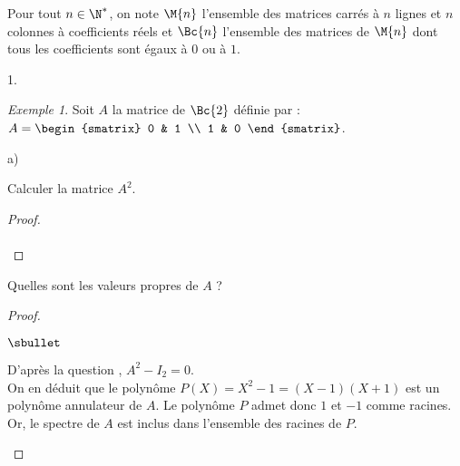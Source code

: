 \noindent
Pour tout $n\in\N^*$, on note $\M{n}$ l'ensemble des matrices carrés à
$n$ lignes et $n$ colonnes à coefficients réels et $\Bc{n}$ l'ensemble
des matrices de $\M{n}$ dont tous les coefficients sont égaux à $0$ ou
à $1$.
\begin{noliste}{1.}
  \setlength{\itemsep}{4mm}
\item {\it Exemple 1}. Soit $A$ la matrice de $\Bc{2}$ définie par :
  $A = 
  \begin{smatrix} 
    0 & 1 \\ 
    1 & 0
  \end{smatrix}$.
  \begin{noliste}{a)}
    \setlength{\itemsep}{2mm}
  \item Calculer la matrice $A^2$.
    
    \begin{proof}~\\[-.6cm]%
      ~\\[-1cm]
    \end{proof}
    
  \item Quelles sont les valeurs propres de $A$ ?
	
    \begin{proof}~
      \begin{noliste}{$\sbullet$}
      \item D'après la question , $A^2 - I_2 = 0$.\\
        On en déduit que le polynôme $P(X) = X^2-1 = (X-1)(X+1)$ est
        un polynôme annulateur de $A$. Le polynôme $P$ admet donc $1$
        et $-1$ comme racines.\\
        Or, le spectre de $A$ est inclus dans l'ensemble des racines
        de $P$. %


\end{noliste}
\end{proof}
\end{noliste}
\end{noliste}
